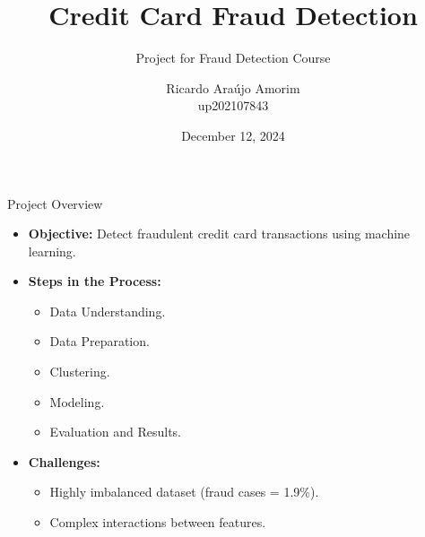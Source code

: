 \documentclass{beamer}
\title{Credit Card Fraud Detection}
\subtitle{Project for Fraud Detection Course}
\author{Ricardo Araújo Amorim \\ up202107843}
\institute{}
\date{December 12, 2024}
\begin{document}
\small

\begin{frame}
    \titlepage
\end{frame}

\begin{frame}{Project Overview}
    \begin{itemize}
        \item \textbf{Objective:} Detect fraudulent credit card transactions using machine learning.
        \item \textbf{Steps in the Process:}
        \begin{itemize}
            \item Data Understanding.
            \item Data Preparation.
            \item Clustering.
            \item Modeling.
            \item Evaluation and Results.
        \end{itemize}
        \item \textbf{Challenges:}
        \begin{itemize}
            \item Highly imbalanced dataset (fraud cases = 1.9\%).
            \item Complex interactions between features.
        \end{itemize}
    \end{itemize}
\end{frame}
\end{document}
